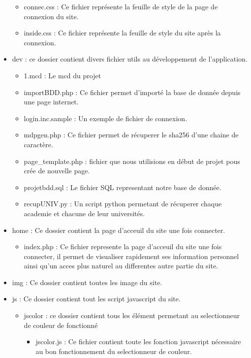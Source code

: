 \documentclass[a4paper,10pt]{report}
\begin{document}
\begin{itemize}
\begin{itemize}
        \item connec.css : Ce fichier représente la feuille de style de la page de connexion du site.
        \item inside.css : Ce fichier représente la feuille de style du site après la connexion.
    \end{itemize}
    \item dev : ce dossier contient divers fichier utils au développement de l'application.
    \begin{itemize}
        \item 1.mcd : Le mcd du projet
        \item importBDD.php : Ce fichier permet d'importé la base de donnée depuis une page internet.
        \item login.inc.sample : Un exemple de fichier de connexion.
        \item mdpgen.php : Ce fichier permet de récuperer le sha256 d'une chaine de caractère.
        \item page\_template.php : fichier que nous utilisions en début de projet pous crée de nouvelle page.
        \item projetbdd.sql : Le fichier SQL representant notre base de donnée.
        \item recupUNIV.py : Un script python permetant de récuperer chaque academie et chacune de leur universités.
    \end{itemize}
    \item home : Ce dossier contient la page d'acceuil du site une fois connecter.
    \begin{itemize}
        \item index.php : Ce fichier represente la page d'acceuil du site une fois connecter, il permet de visualiser rapidement ses information personnel
        ainsi qu'un acces plus naturel au differentes autre partie du site.
    \end{itemize}
    \item img : Ce dossier contient toutes les image du site.
    \item js : Ce dossier contient tout les script javascript du site.
    \begin{itemize}
        \item jscolor : ce dossier contient tous les élément permetant au selectionneur de couleur de fonctionné
        \begin{itemize}
            \item jscolor.js : Ce fichier contient toute les fonction javascript nécessaire au bon fonctionnement du selectionneur de couleur.

\end{itemize}
\end{itemize}
\end{itemize}
\end{document}
